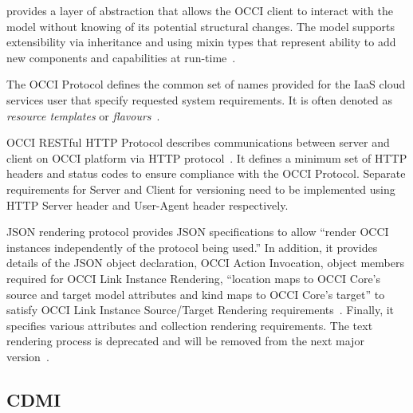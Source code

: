      provides a layer of abstraction that allows the OCCI client to
     interact with the model without knowing of its potential
     structural changes. The model supports extensibility via
     inheritance and using mixin types that represent ability to add
     new components and capabilities at
     run-time~\cite{nyren-edmonds-papaspyrou-2016}.

     The OCCI Protocol defines the common set of names provided for
     the IaaS cloud services user that specify requested system
     requirements. It is often denoted as \textit{resource templates}
     or \textit{flavours}~\cite{drescher-parak-wallom-2015}.

     OCCI RESTful HTTP Protocol describes communications between
     server and client on OCCI platform via HTTP
     protocol~\cite{nyren-edmonds-metsch-2016}. It defines a minimum
     set of HTTP headers and status codes to ensure compliance with
     the OCCI Protocol. Separate requirements for Server and Client
     for versioning need to be implemented using HTTP Server header
     and User-Agent header respectively.

     JSON rendering protocol provides JSON specifications to allow
     ``render OCCI instances independently of the protocol being
     used.'' In addition, it provides details of the JSON object
     declaration, OCCI Action Invocation, object members required for
     OCCI Link Instance Rendering, ``location maps to OCCI Core's
     source and target model attributes and kind maps to OCCI Core's
     target'' to satisfy OCCI Link Instance Source/Target Rendering
     requirements~\cite{nyren-feldhaus-parak-2016}.  Finally, it
     specifies various attributes and collection rendering
     requirements.  The text rendering process is deprecated and will
     be removed from the next major
     version~\cite{edmonds-metsch-2016}.

     \pv
	 
\subsection{CDMI}


